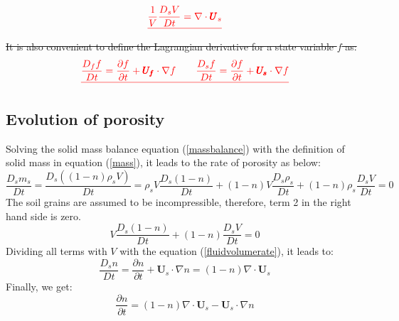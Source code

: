 \documentclass[preprint,12pt]{elsarticle}
\providecommand{\DIFdel}[1]{{\protect\color{red}\sout{#1}}}                      %
\providecommand{\DIFdelbegin}{} %
\providecommand{\DIFdelend}{} %
\newcommand{\DIFscaledelfig}{0.5}
\newlength{\DIFdelgraphicswidth} %
\newlength{\DIFdelgraphicsheight} %
\newcommand{\DIFdelincludegraphics}[2][]{%
\sbox{\DIFdelgraphicsbox}{\DIFOincludegraphics[#1]{#2}}%
\settoboxwidth{\DIFdelgraphicswidth}{\DIFdelgraphicsbox} %
\settoboxtotalheight{\DIFdelgraphicsheight}{\DIFdelgraphicsbox} %
\scalebox{\DIFscaledelfig}{%
\parbox[b]{\DIFdelgraphicswidth}{\usebox{\DIFdelgraphicsbox}\\[-\baselineskip] \rule{\DIFdelgraphicswidth}{0em}}\llap{\resizebox{\DIFdelgraphicswidth}{\DIFdelgraphicsheight}{%
\setlength{\unitlength}{\DIFdelgraphicswidth}%
\begin{picture}(1,1)%
\thicklines\linethickness{2pt} %
{\color[rgb]{1,0,0}\put(0,0){\framebox(1,1){}}}%
{\color[rgb]{1,0,0}\put(0,0){\line( 1,1){1}}}%
{\color[rgb]{1,0,0}\put(0,1){\line(1,-1){1}}}%
\end{picture}%
}\hspace*{3pt}}} %
} %
\DeclareRobustCommand{\DIFdelbegin}{\DIFOdelbegin \let\includegraphics\DIFdelincludegraphics} %
\DeclareRobustCommand{\DIFdelend}{\DIFOaddend \let\includegraphics\DIFOincludegraphics} %
\begin{document}
%
%
\DIFdelbegin \begin{displaymath}
\DIFdel{%
 \frac{1}{V} \frac{D_s V}{D t} = \nabla \cdot \pmb{U}_s
}\end{displaymath}%
\DIFdel{It is also convenient to define the Lagrangian derivative for a state variable $f$ as:
}\begin{displaymath}
\DIFdel{\frac{D_f f}{Dt} =  \frac{\partial f}{\partial t} + \pmb{U_f} \cdot \nabla f \qquad
\frac{D_s f}{Dt} =  \frac{\partial f}{\partial t} + \pmb{U_s} \cdot \nabla f
}\end{displaymath}%
\DIFdelend \subsection{\textsf{Evolution of porosity}}
%
%
Solving the solid mass balance equation (\ref{massbalance}) with the definition of solid mass in equation (\ref{mass}), it leads to the rate of porosity as below:
%
%
\begin{equation}
   \frac{D_sm_s}{Dt} = \frac{D_s((1-n) \rho_s V)}{Dt} = \rho_s V \frac{D_s(1-n)}{Dt} + (1-n) V \frac{D_s \rho_s}{Dt} + (1-n) \rho_s  \frac{D_s V}{Dt} = 0  
\end{equation}
%
%
The soil grains are assumed to be incompressible, therefore, term 2 in the right hand side is zero. 
%
%
\begin{equation}
  V \frac{D_s(1-n)}{Dt} + (1-n) \frac{D_s V}{Dt} = 0  
\end{equation}
%
%
Dividing all terms with $V$ with the equation (\ref{fluidvolumerate}), it leads to:
%
%
\begin{equation}
  \frac{D_s n}{Dt} = \frac{\partial n}{\partial t} + \pmb{U}_s \cdot \nabla n = 
  (1-n) \nabla \cdot \pmb{U}_s  
\end{equation}
%
%
Finally, we get:
%
%
\begin{equation}
\label{p1}
\frac{\partial n}{\partial t} = (1-n) \nabla \cdot \pmb{U}_s  - \pmb{U}_s \cdot \nabla n
\end{equation}
%
%
\end{document}
